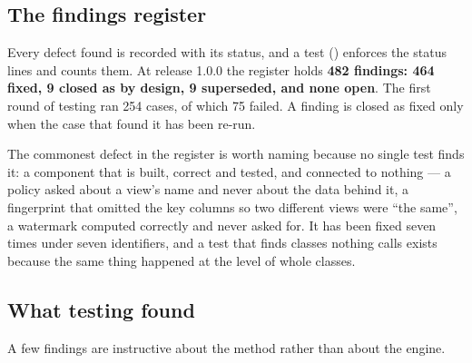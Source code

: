 \documentclass[11pt,a4paper]{article}
\renewcommand{\_}{\oldunderscore\allowbreak}
\newcommand{\cls}[1]{\texttt{\pvbreakable{#1}}}
\begin{document}
\subsection{The findings register}

Every defect found is recorded with its status, and a test (\cls{FindingsRegisterTest}) enforces the
status lines and counts them. At release 1.0.0 the register holds \textbf{482 findings: 464 fixed, 9
closed as by design, 9 superseded, and none open}. The first round of testing ran 254 cases, of which 75
failed. A finding is closed as fixed only when the case that found it has been re-run.

The commonest defect in the register is worth naming because no single test finds it: a component that
is built, correct and tested, and connected to nothing --- a policy asked about a view's name and never
about the data behind it, a fingerprint that omitted the key columns so two different views were ``the
same'', a watermark computed correctly and never asked for. It has been fixed seven times under seven
identifiers, and a test that finds classes nothing calls exists because the same thing happened at the
level of whole classes.

\subsection{What testing found}

A few findings are instructive about the method rather than about the engine.
\end{document}
